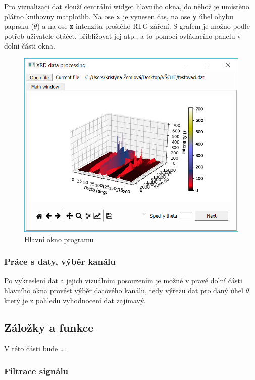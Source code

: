 \documentclass[a4paper, 12pt]{article}
\begin{document}
Pro vizualizaci dat slouží centrální widget hlavního okna, do něhož je umístěno plátno knihovny matplotlib. Na ose \textbf{x} je vynesen čas, na ose \textbf{y} úhel ohybu paprsku ($\theta$) a na ose \textbf{z} intenzita prošlého RTG záření. S grafem je možno podle potřeb uživatele otáčet, přibližovat jej atp., a to pomocí ovládacího panelu v dolní části okna.

\begin{figure}[hbt!]
    \centering
    \includegraphics[width=\linewidth]{mainWin_grph.PNG}
    \caption{Hlavní okno programu}
    \label{fig:mainWin}
\end{figure}

\subsubsection{Práce s daty, výběr kanálu} \label{sec:channel}
Po vykreslení dat a jejich vizuálním posouzením je možné v pravé dolní části hlavního okna provést výběr datového kanálu, tedy výřezu dat pro daný úhel $\theta$, který je z pohledu vyhodnocení dat zajímavý. 
\subsection{Záložky a funkce} \label{sec:fcntabs}
V této části bude \ldots .

\subsubsection{Filtrace signálu}\label{sec:exp_filtrace}
\end{document}
